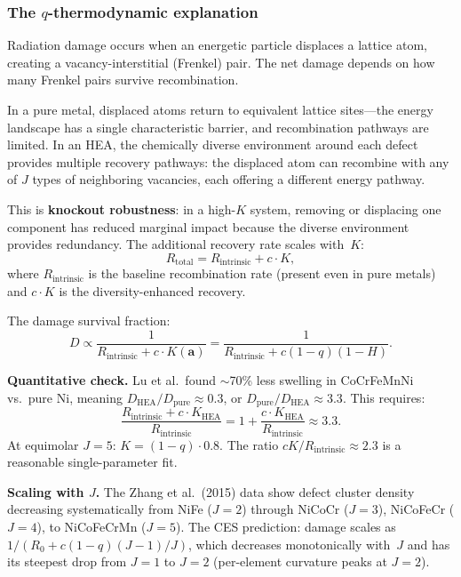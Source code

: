 \documentclass[12pt,letterpaper]{article}
\theoremstyle{definition}
\begin{document}
\subsubsection{The $q$-thermodynamic explanation}

Radiation damage occurs when an energetic particle displaces a lattice atom, creating a vacancy-interstitial (Frenkel) pair.  The net damage depends on how many Frenkel pairs survive recombination.

In a pure metal, displaced atoms return to equivalent lattice sites---the energy landscape has a single characteristic barrier, and recombination pathways are limited.  In an HEA, the chemically diverse environment around each defect provides multiple recovery pathways: the displaced atom can recombine with any of $J$ types of neighboring vacancies, each offering a different energy pathway.

This is \textbf{knockout robustness}: in a high-$K$ system, removing or displacing one component has reduced marginal impact because the diverse environment provides redundancy.  The additional recovery rate scales with~$K$:
\begin{equation}
  R_{\mathrm{total}} = R_{\mathrm{intrinsic}} + c \cdot K,
\end{equation}
where $R_{\mathrm{intrinsic}}$ is the baseline recombination rate (present even in pure metals) and $c \cdot K$ is the diversity-enhanced recovery.

The damage survival fraction:
\begin{equation}\label{eq:rad_damage}
  D \propto \frac{1}{R_{\mathrm{intrinsic}} + c \cdot K(\mathbf{a})} = \frac{1}{R_{\mathrm{intrinsic}} + c(1-q)(1-H)}.
\end{equation}

\textbf{Quantitative check.}  Lu et al.\ found $\sim$70\% less swelling in CoCrFeMnNi vs.\ pure Ni, meaning $D_{\mathrm{HEA}}/D_{\mathrm{pure}} \approx 0.3$, or $D_{\mathrm{pure}}/D_{\mathrm{HEA}} \approx 3.3$.  This requires:
\begin{equation}
  \frac{R_{\mathrm{intrinsic}} + c \cdot K_{\mathrm{HEA}}}{R_{\mathrm{intrinsic}}} = 1 + \frac{c \cdot K_{\mathrm{HEA}}}{R_{\mathrm{intrinsic}}} \approx 3.3.
\end{equation}
At equimolar $J = 5$: $K = (1-q) \cdot 0.8$.  The ratio $cK/R_{\mathrm{intrinsic}} \approx 2.3$ is a reasonable single-parameter fit.

\textbf{Scaling with $J$.}  The Zhang et al.\ (2015) data show defect cluster density decreasing systematically from NiFe ($J = 2$) through NiCoCr ($J = 3$), NiCoFeCr ($J = 4$), to NiCoFeCrMn ($J = 5$).  The CES prediction: damage scales as $1/(R_0 + c(1-q)(J-1)/J)$, which decreases monotonically with~$J$ and has its steepest drop from $J = 1$ to $J = 2$ (per-element curvature peaks at $J = 2$).
\end{document}
